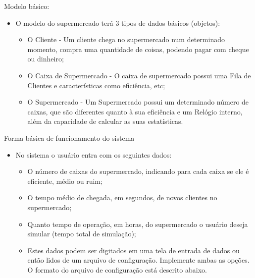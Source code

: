 \documentclass[12pt,table,xcolor={dvipsnames}]{beamer}
\begin{document}
\begin{frame}[fragile]{Modelo básico:}
\begin{itemize}
\item O modelo do supermercado terá 3 tipos de dados básicos (objetos):
\begin{itemize}
\item O Cliente - Um cliente chega no supermercado num determinado momento, compra uma quantidade de coisas, podendo pagar com cheque ou dinheiro;
\item O Caixa de Supermercado - O caixa de supermercado possui uma Fila de Clientes e características como eficiência, etc;
\item O Supermercado - Um Supermercado possui um determinado número de caixas, que são diferentes quanto à sua eficiência e um Relógio interno, além da capacidade de calcular as suas estatísticas.
\end{itemize}
\end{itemize}
\end{frame}

 \begin{frame}[fragile]{Forma básica de funcionamento do sistema}
\begin{itemize}
\item No sistema o usuário entra com os seguintes dados:
\begin{itemize}
\item O número de caixas do supermercado, indicando para cada caixa se ele é eficiente, médio ou ruim;
\item O tempo médio de chegada, em segundos, de novos clientes no supermercado;
\item Quanto tempo de operação, em horas, do supermercado o usuário deseja simular (tempo total de simulação);
\item Estes dados podem ser digitados em uma tela de entrada de dados ou então lidos de um arquivo de configuração. Implemente ambas as opções. O formato do arquivo de configuração está descrito abaixo.
\end{itemize}
\end{itemize}
\end{frame}
\end{document}
